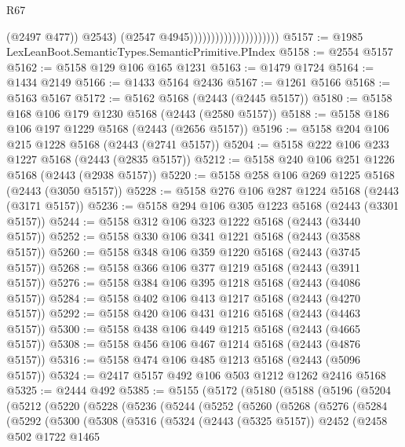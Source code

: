 \begin{lexlean}{R67}
\begin{coremodule}
                                                (@2497 @477))
                                              @2543)
                                            (@2547 @4945)))))))))))))))))))))
@5157 := @1985 LexLeanBoot.SemanticTypes.SemanticPrimitive.PIndex
@5158 := @2554 @5157
@5162 := @5158 @129 @106 @165 @1231
@5163 := @1479 @1724
@5164 := @1434 @2149
@5166 := @1433 @5164 @2436
@5167 := @1261 @5166
@5168 := @5163 @5167
@5172 := @5162 @5168 (@2443 (@2445 @5157))
@5180 := @5158 @168 @106 @179 @1230 @5168 (@2443 (@2580 @5157))
@5188 := @5158 @186 @106 @197 @1229 @5168 (@2443 (@2656 @5157))
@5196 := @5158 @204 @106 @215 @1228 @5168 (@2443 (@2741 @5157))
@5204 := @5158 @222 @106 @233 @1227 @5168 (@2443 (@2835 @5157))
@5212 := @5158 @240 @106 @251 @1226 @5168 (@2443 (@2938 @5157))
@5220 := @5158 @258 @106 @269 @1225 @5168 (@2443 (@3050 @5157))
@5228 := @5158 @276 @106 @287 @1224 @5168 (@2443 (@3171 @5157))
@5236 := @5158 @294 @106 @305 @1223 @5168 (@2443 (@3301 @5157))
@5244 := @5158 @312 @106 @323 @1222 @5168 (@2443 (@3440 @5157))
@5252 := @5158 @330 @106 @341 @1221 @5168 (@2443 (@3588 @5157))
@5260 := @5158 @348 @106 @359 @1220 @5168 (@2443 (@3745 @5157))
@5268 := @5158 @366 @106 @377 @1219 @5168 (@2443 (@3911 @5157))
@5276 := @5158 @384 @106 @395 @1218 @5168 (@2443 (@4086 @5157))
@5284 := @5158 @402 @106 @413 @1217 @5168 (@2443 (@4270 @5157))
@5292 := @5158 @420 @106 @431 @1216 @5168 (@2443 (@4463 @5157))
@5300 := @5158 @438 @106 @449 @1215 @5168 (@2443 (@4665 @5157))
@5308 := @5158 @456 @106 @467 @1214 @5168 (@2443 (@4876 @5157))
@5316 := @5158 @474 @106 @485 @1213 @5168 (@2443 (@5096 @5157))
@5324 := @2417 @5157 @492 @106 @503 @1212 @1262 @2416 @5168
@5325 := @2444 @492
@5385 := @5155
    (@5172
      (@5180
        (@5188
          (@5196
            (@5204
              (@5212
                (@5220
                  (@5228
                    (@5236
                      (@5244
                        (@5252
                          (@5260
                            (@5268
                              (@5276
                                (@5284
                                  (@5292
                                    (@5300
                                      (@5308
                                        (@5316
                                          (@5324
                                            (@2443 (@5325 @5157))
                                            @2452
                                            (@2458
                                              @502
                                              @1722
                                              @1465

\end{coremodule}
\end{lexlean}
